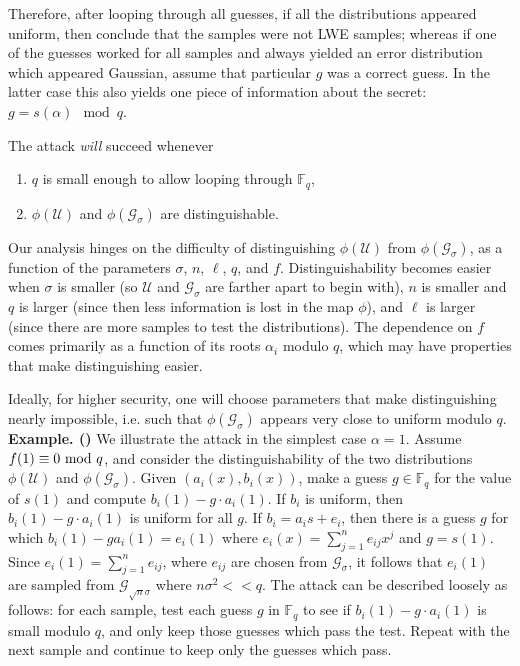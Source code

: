 \documentclass{llncs}
\def\Gcal{{\mathcal G}}
\def\Ucal{{\mathcal U}}
\newcommand{\FF}{\mathbb{F}}
\newcommand{\<}{\langle}
\renewcommand{\>}{\rangle}
\begin{document}
Therefore, after looping through all guesses, if all the distributions appeared uniform, then conclude that the samples were not LWE samples; whereas if one of the guesses worked for all samples and always yielded an error distribution which  appeared Gaussian, assume that particular $g$ was a correct guess.
In the latter case this also yields one piece of information about the secret:  $g=s(\alpha) \mod q$.

The attack \emph{will} succeed whenever
\begin{enumerate}
        \item $q$ is small enough to allow looping through $\FF_q$,
        \item $\phi(\mathcal{U})$ and $\phi(\mathcal{G}_{\sigma})$ are distinguishable.
\end{enumerate}

Our analysis hinges on the difficulty of distinguishing $\phi(\mathcal{U})$ from $\phi(\mathcal{G}_{\sigma})$, as a function of the parameters $\sigma$, $n$, $\ell$, $q$, and $f$.  Distinguishability becomes easier when $\sigma$ is smaller (so $\mathcal{U}$ and $\mathcal{G}_{\sigma}$ are farther apart to begin with), $n$ is smaller and $q$ is larger (since then less information is lost in the map $\phi$), and $\ell$ is larger (since there are more samples to test the distributions).  The dependence on $f$ comes primarily as a function of its roots $\alpha_i$ modulo $q$, which may have properties that make distinguishing easier.

Ideally, for higher security, one will choose parameters that make distinguishing nearly impossible, i.e. such that $\phi(\mathcal{G}_{\sigma})$ appears very close to uniform modulo $q$.\\


{\bf Example. (\cite{EHL})} We illustrate the attack in the simplest case $\alpha=1$. Assume $f(1) \equiv 0 \hbox{ mod } q$, and consider the distinguishability of the two distributions $\phi(\Ucal)$ and $\phi(\Gcal_\sigma)$.
Given $(a_i(x), b_i(x))$, make a guess $g\in \FF_q$ for the value of $s(1)$ and compute $b_i(1)-g\cdot a_i(1)$.
If $b_i $ is uniform, then $b_i(1)-g \cdot a_i(1)$ is uniform  for all $g$.
If $b_i=a_i s +e_i$, then there is a guess $g$ for which $b_i(1)-ga_i(1)=e_i(1)$ where $e_i(x)=\sum_{j=1}^n e_{ij}x^j$ and $g=s(1)$.
Since $e_i(1) = \sum_{j=1}^n e_{ij}$, where $e_{ij}$ are chosen from $\mathcal{G}_{\sigma}$, it follows that $e_i(1)$ are sampled from $\Gcal_{\sqrt{n}\sigma}$ where $n\sigma^2<< q$. The attack can be described loosely as follows: for each sample, test each guess $g$ in $\FF_q$ to see if $b_i(1)-g \cdot a_i(1)$ is small modulo $q$, and only keep those guesses which pass the test. Repeat with the next sample and continue to keep only the guesses which pass.
\end{document}

